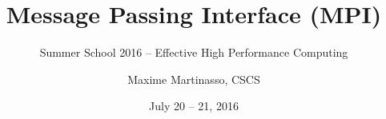 
\newcommand{\SummerSchoolYear}{2016}
\newcommand{\SummerSchoolDate}{July 20 -- 21}
\newcommand{\SummerSchoolAuthor}{Maxime Martinasso}

\newcommand{\footlinetext}{Summer School \SummerSchoolYear{} -- MPI}

\author{\SummerSchoolAuthor, CSCS}
\title{Message Passing Interface (MPI)}
\subtitle{Summer School \SummerSchoolYear{}  -- Effective High Performance Computing}
\date{\SummerSchoolDate, \SummerSchoolYear}
